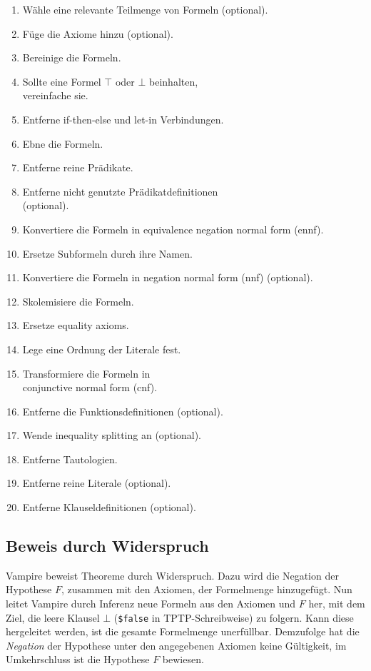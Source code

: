 \documentclass{article}
\begin{document}
\begin{enumerate}
	\itemsep0em 
	\item Wähle eine relevante Teilmenge von Formeln (optional).
	\item Füge die Axiome hinzu (optional).
	\item Bereinige die Formeln.
	\item Sollte eine Formel $\top$ oder $\bot$ beinhalten, \\vereinfache sie.
	\item Entferne if-then-else und let-in Verbindungen.
	\item Ebne die Formeln.
	\item Entferne reine Prädikate.
	\item Entferne nicht genutzte Prädikatdefinitionen \\(optional).
	\item Konvertiere die Formeln in equivalence negation normal form (ennf).
	\item Ersetze Subformeln durch ihre Namen.
	\item Konvertiere die Formeln in negation normal form (nnf) (optional).
	\item Skolemisiere die Formeln.
	\item Ersetze equality axioms.
	\item Lege eine Ordnung der Literale fest.
	\item Transformiere die Formeln in \\conjunctive normal form (cnf).
	\item Entferne die Funktionsdefinitionen (optional).
	\item Wende inequality splitting an (optional).
	\item Entferne Tautologien.
	\item Entferne reine Literale (optional).
	\item Entferne Klauseldefinitionen (optional).
\end{enumerate}

\subsection{Beweis durch Widerspruch}
\label{subsec:refutation}

Vampire beweist Theoreme durch Widerspruch.
Dazu wird die Negation der Hypothese $F$, zusammen mit den Axiomen,
der Formelmenge hinzugefügt.
Nun leitet Vampire durch Inferenz neue Formeln aus den Axiomen und $F$ her, 
mit dem Ziel, die leere Klausel $\bot$ (\texttt{\$false} in TPTP-Schreibweise) zu folgern.
Kann diese hergeleitet werden, ist die gesamte Formelmenge unerfüllbar.
Demzufolge hat die \textit{Negation} der Hypothese unter den angegebenen Axiomen keine Gültigkeit,
im Umkehrschluss ist die Hypothese $F$ bewiesen. \cite[S. 5]{cav2013}
\end{document}

